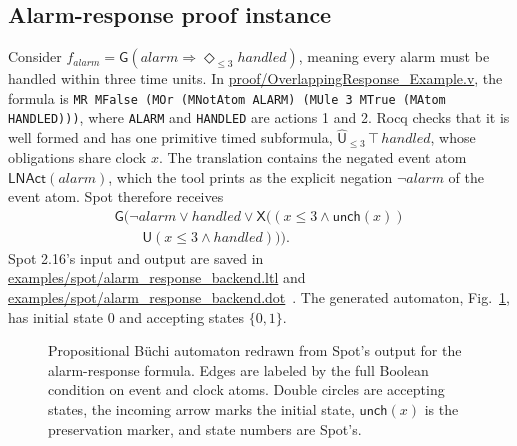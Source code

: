 \documentclass{ieeeaccess}
\newcommand{\Until}{\mathbin{\mathsf{U}}}
\newcommand{\Next}{\mathsf{X}}
\newcommand{\Unch}{\mathsf{unch}}
\newcommand{\Rocqid}[1]{\url{#1}}
\begin{document}
\subsection{Alarm-response proof instance}
\label{sec:alarm-example}
Consider $f_{\mathit{alarm}}=\mathsf{G}(\mathit{alarm}\Rightarrow
\Diamond_{\le 3}\mathit{handled})$, meaning every alarm must be handled within
three time units. In
\Rocqid{proof/OverlappingResponse_Example.v}, the formula is
\texttt{MR MFalse (MOr (MNotAtom ALARM) (MUle 3 MTrue (MAtom HANDLED)))},
where \texttt{ALARM} and \texttt{HANDLED} are actions 1 and 2. Rocq checks
that it is well formed and has one primitive timed subformula,
$\widehat{\mathsf{U}}_{\le 3}\,\top\,\mathit{handled}$, whose obligations
share clock $x$. The translation contains the negated event atom
$\mathsf{LNAct}(\mathit{alarm})$, which the tool prints as the explicit
negation $\neg\mathit{alarm}$ of the event atom. Spot therefore
receives
\begin{multline*}
\mathsf{G}\bigl(\neg\mathit{alarm}\lor \mathit{handled}\lor
\Next((x\le3\land\Unch(x))\\
\qquad\Until(x\le3\land\mathit{handled}))\bigr).
\end{multline*}
Spot 2.16's input and output are saved in
\Rocqid{examples/spot/alarm_response_backend.ltl} and
\Rocqid{examples/spot/alarm_response_backend.dot}~\cite{[spot]}. The generated
automaton, Fig.~\ref{fig:alarm-backend}, has initial state 0 and accepting
states $\{0,1\}$.
\begin{figure}[t]
\centering
{}
\caption{Propositional B\"uchi automaton redrawn from Spot's output for the
alarm-response formula. Edges are labeled by the full Boolean condition on
event and clock atoms. Double circles are accepting states, the incoming arrow
marks the initial state, $\Unch(x)$ is the preservation marker, and state
numbers are Spot's.}
\label{fig:alarm-backend}
\end{figure}
\end{document}
